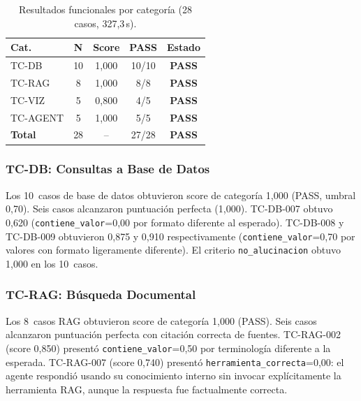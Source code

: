 \documentclass[11pt,a4paper,twocolumn]{article}
\begin{document}
\begin{table}[H]
\centering
\caption{Resultados funcionales por categor\'{i}a (28 casos, 327,3\,s).}
\label{tab:funcional}
\footnotesize
\begin{tabularx}{\columnwidth}{lcccc}
\toprule
\textbf{Cat.} & \textbf{N} & \textbf{Score} & \textbf{PASS} & \textbf{Estado} \\
\midrule
TC-DB    & 10 & 1,000 & 10/10 & \textcolor{success}{\textbf{PASS}} \\
TC-RAG   & 8  & 1,000 & 8/8   & \textcolor{success}{\textbf{PASS}} \\
TC-VIZ   & 5  & 0,800 & 4/5   & \textcolor{success}{\textbf{PASS}} \\
TC-AGENT & 5  & 1,000 & 5/5   & \textcolor{success}{\textbf{PASS}} \\
\midrule
\textbf{Total} & 28 & -- & 27/28 & \textcolor{success}{\textbf{PASS}} \\
\bottomrule
\end{tabularx}
\end{table}

\subsubsection{TC-DB: Consultas a Base de Datos}

Los 10~casos de base de datos obtuvieron score de categor\'{i}a 1,000 (PASS, umbral 0,70). Seis casos alcanzaron puntuaci\'{o}n perfecta (1,000). TC-DB-007 obtuvo 0,620 (\texttt{contiene\_valor}=0,00 por formato diferente al esperado). TC-DB-008 y TC-DB-009 obtuvieron 0,875 y 0,910 respectivamente (\texttt{contiene\_valor}=0,70 por valores con formato ligeramente diferente). El criterio \texttt{no\_alucinacion} obtuvo 1,000 en los 10~casos.

\subsubsection{TC-RAG: B\'{u}squeda Documental}

Los 8~casos RAG obtuvieron score de categor\'{i}a 1,000 (PASS). Seis casos alcanzaron puntuaci\'{o}n perfecta con citaci\'{o}n correcta de fuentes. TC-RAG-002 (score 0,850) present\'{o} \texttt{contiene\_valor}=0,50 por terminolog\'{i}a diferente a la esperada. TC-RAG-007 (score 0,740) present\'{o} \texttt{herramienta\_correcta}=0,00: el agente respondi\'{o} usando su conocimiento interno sin invocar expl\'{i}citamente la herramienta RAG, aunque la respuesta fue factualmente correcta.
\end{document}

